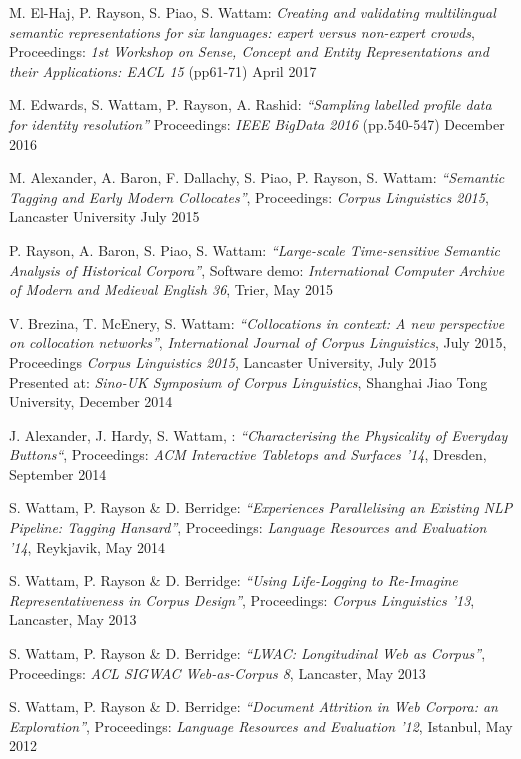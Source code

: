 \documentclass{res}
\begin{document}
\begin{resume}
M. El-Haj, P. Rayson, S. Piao, S. Wattam:
\textsl{Creating and validating multilingual semantic representations for six languages: expert versus non-expert crowds},
Proceedings: \textit{1st Workshop on Sense, Concept and Entity Representations and their Applications: EACL 15} (pp61-71)
April 2017

M. Edwards, S. Wattam, P. Rayson, A. Rashid:
\textsl{``Sampling labelled profile data for identity resolution''}
Proceedings: \textit{IEEE BigData 2016} (pp.540-547)
December 2016

M. Alexander, A. Baron, F. Dallachy, S. Piao, P. Rayson, S. Wattam:
\textsl{``Semantic Tagging and Early Modern Collocates''},
Proceedings: {\it Corpus Linguistics 2015},
Lancaster University
July 2015

P. Rayson, A. Baron, S. Piao, S. Wattam:
\textsl{``Large-scale Time-sensitive Semantic Analysis of Historical Corpora''},
Software demo: {\it International Computer Archive of Modern and Medieval English 36},
Trier,
May 2015

V. Brezina, T. McEnery, S. Wattam:
\textsl{``Collocations in context: A new perspective on collocation networks''},
{\it International Journal of Corpus Linguistics},
July 2015,\\
Proceedings {\it Corpus Linguistics 2015},
Lancaster University, 
July 2015\\
Presented at: {\it Sino-UK Symposium of Corpus Linguistics},
Shanghai Jiao Tong University,
December 2014


J. Alexander, J. Hardy, S. Wattam, :
\textsl{``Characterising the Physicality of Everyday Buttons``},
Proceedings: {\it ACM Interactive Tabletops and Surfaces '14},
Dresden,
September 2014


S. Wattam, P. Rayson \& D. Berridge:
\textsl{``Experiences Parallelising an Existing NLP Pipeline: Tagging Hansard''},
Proceedings: {\it Language Resources and Evaluation '14},
Reykjavik,
May 2014


S. Wattam, P. Rayson \& D. Berridge:
\textsl{``Using Life-Logging to Re-Imagine Representativeness in Corpus Design''},
Proceedings: {\it Corpus Linguistics '13},
Lancaster,
May 2013


S. Wattam, P. Rayson \& D. Berridge:
\textsl{``LWAC: Longitudinal Web as Corpus''},
Proceedings: {\it ACL SIGWAC Web-as-Corpus 8},
Lancaster,
May 2013


S. Wattam, P. Rayson \& D. Berridge:
\textsl{``Document Attrition in Web Corpora: an Exploration''},
Proceedings: {\it Language Resources and Evaluation '12},
Istanbul,
May 2012



\end{resume}
\end{document}
